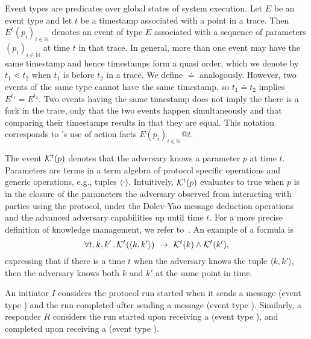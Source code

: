 Event types are predicates over global states of system execution.
%
Let $E$ be an event type and let $t$ be a timestamp associated with a point in a
trace.
%
Then $E^{t}(p_i)_{i\in\mathbb{N}}$ denotes an event of type $E$ associated with
a sequence of parameters $(p_i)_{i\in\mathbb{N}}$ at time $t$ in that trace.
%
In general, more than one event may have the same timestamp and hence
timestamps form a quasi order, which we denote by $t_1 \lessdot t_2$ when $t_1$
is before $t_2$ in a trace.
%
We define $\doteq$ analogously.
%
However, two events of the same type cannot have the same timestamp, so
$t_1 \doteq t_2$ implies $E^{t_1} = E^{t_2}$.
%
Two events having the same timestamp does not imply the there is a fork in the
trace, only that the two events happen simultaneously and that comparing their
timestamps results in that they are equal.
%
This notation corresponds to \mTamarin{}'s use of action facts
$E(p_i)_{i\in\mathbb{N}}@t$.
%

%
%
The event $\mathcal{K}^t(p)$ denotes that the adversary knows a parameter $p$ at
time $t$.
%
Parameters are terms in a term algebra of protocol specific operations and
generic operations, e.g., tuples $\langle\cdot\rangle$.
%
Intuitively, $\mathcal{K}^t(p)$ evaluates to true when $p$ is in
the closure of the
parameters the adversary observed from interacting with parties using the
protocol, under the Dolev-Yao message deduction operations and
the advanced adversary capabilities up until time $t$.
%
For a more precise definition of knowledge management, we refer to~\cite{DBLP:conf/cav/MeierSCB13}.
%
An example of a formula is
\[
    \forall t, k, k'\mLogicDot \mK^{t}(\langle k, k'\rangle)\ \rightarrow\ 
\mK^{t}(k) \land \mK^{t}(k'),
\]
expressing that if there is a time $t$ when the adversary knows the tuple
$\langle k, k'\rangle$, then the adversary knows both
$k$ and $k'$ at the same point in time.
%

An initiator $I$ considers the
protocol run started when it sends a message \mMsgone{} (event type \mIStart)
and the run completed after sending a message \mMsgthree{} (event type
\mIComplete).
%
Similarly, a responder $R$ considers the run started upon receiving
a \mMsgone{} (event type \mRStart), and completed upon receiving a \mMsgthree{}
(event type \mRComplete).
%
%

